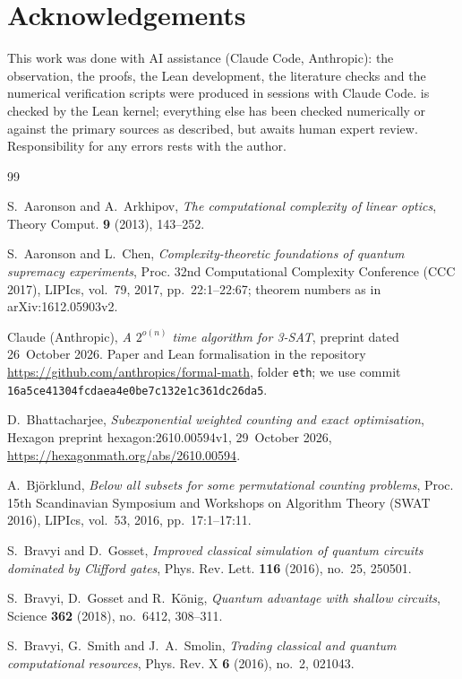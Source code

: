 \documentclass[10pt]{amsart}
\theoremstyle{plain}
\theoremstyle{definition}
\theoremstyle{remark}
\numberwithin{equation}{section}
\begin{document}
\section*{Acknowledgements}
This work was done with AI assistance (Claude Code, Anthropic): the observation, the proofs, the Lean
development, the literature checks and the numerical verification scripts were produced in sessions
with Claude Code.  is checked by the Lean kernel; everything else has been checked
numerically or against the primary sources as described, but awaits human expert review.
Responsibility for any errors rests with the author.
\begin{thebibliography}{99}

S.~Aaronson and A.~Arkhipov, \emph{The computational complexity of linear optics}, Theory Comput.
\textbf{9} (2013), 143--252.

S.~Aaronson and L.~Chen, \emph{Complexity-theoretic foundations of quantum supremacy experiments},
Proc. 32nd Computational Complexity Conference (CCC 2017), LIPIcs, vol.~79, 2017, pp.~22:1--22:67;
theorem numbers as in arXiv:1612.05903v2.

Claude (Anthropic), \emph{A $2^{o(n)}$ time algorithm for {3-SAT}}, preprint dated 26~October 2026.
Paper and Lean formalisation in the repository \url{https://github.com/anthropics/formal-math}, folder
\texttt{eth}; we use commit \texttt{16a5ce41304fcdaea4e0be7c132e1c361dc26da5}.

D.~Bhattacharjee, \emph{Subexponential weighted counting and exact optimisation}, Hexagon preprint
hexagon:2610.00594v1, 29~October 2026, \url{https://hexagonmath.org/abs/2610.00594}.

A.~Bj{\"o}rklund, \emph{Below all subsets for some permutational counting problems}, Proc. 15th
Scandinavian Symposium and Workshops on Algorithm Theory (SWAT 2016), LIPIcs, vol.~53, 2016,
pp.~17:1--17:11.

S.~Bravyi and D.~Gosset, \emph{Improved classical simulation of quantum circuits dominated by
{C}lifford gates}, Phys. Rev. Lett. \textbf{116} (2016), no.~25, 250501.

S.~Bravyi, D.~Gosset and R.~K{\"o}nig, \emph{Quantum advantage with shallow circuits}, Science
\textbf{362} (2018), no.~6412, 308--311.

S.~Bravyi, G.~Smith and J.~A.~Smolin, \emph{Trading classical and quantum computational resources},
Phys. Rev. X \textbf{6} (2016), no.~2, 021043.


\end{thebibliography}
\end{document}

